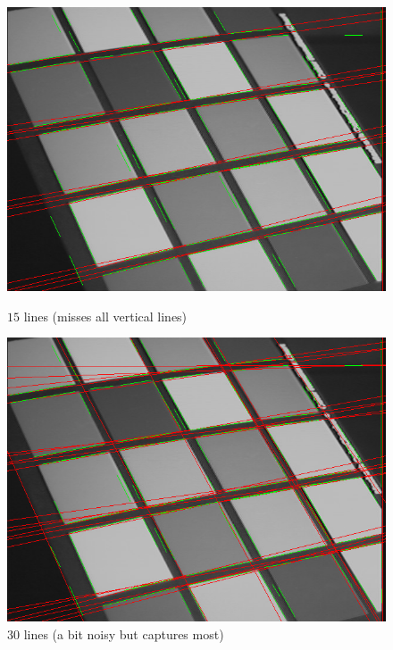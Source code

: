 \begin{enumroman}
    \begin{figure}[H]
      \centering
      \begin{minipage}{0.4\textwidth}
        \includegraphics[width=\textwidth]{images/01-numlines-15.png}
        \caption{$15$ lines (misses all vertical lines)}
        \label{fig:lines-150}
      \end{minipage}
      \begin{minipage}{0.4\textwidth}
        \includegraphics[width=\textwidth]{images/01-numlines-30.png}
        \caption{30 lines (a bit noisy but captures most)}
        \label{fig:lines-30}
      \end{minipage}
      \begin{minipage}{0.4\textwidth}

\end{minipage}
\end{figure}
\end{enumroman}
